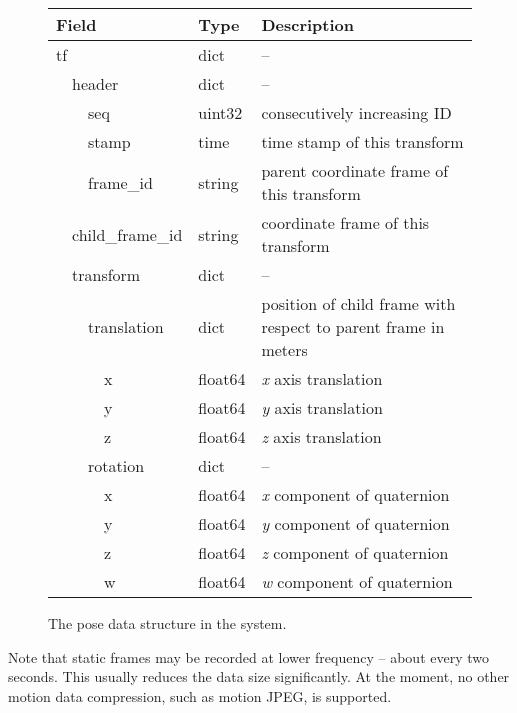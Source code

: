 \def\arraystretch{1.1}%
\begin{figure}[htb]
\begin{center}\begin{tabular}{ >{\ttfamily}p{3.5cm} >{\ttfamily}p{2cm} p{5cm} }
\toprule
\bf Field   & \bf Type & \bf Description \\ \midrule
tf			& dict	& -- \\
\ \ header		& dict		& -- \\
\ \ \ \ seq		& uint32	& consecutively increasing ID \\
\ \ \ \ stamp		& time		& time stamp of this transform \\
\ \ \ \ frame\_id	& string	& parent coordinate frame of this transform \\
\ \ child\_frame\_id	& string	& coordinate frame of this transform \\
\ \ transform		& dict		& -- \\
\ \ \ \ translation	& dict		& position of child frame with respect to parent frame in meters \\
\ \ \ \ \ \ x		& float64	& \emph{x} axis translation \\
\ \ \ \ \ \ y		& float64	& \emph{y} axis translation \\
\ \ \ \ \ \ z		& float64	& \emph{z} axis translation \\
\ \ \ \ rotation	& dict		& -- \\
\ \ \ \ \ \ x		& float64	& \emph{x} component of quaternion \\
\ \ \ \ \ \ y		& float64	& \emph{y} component of quaternion \\
\ \ \ \ \ \ z		& float64	& \emph{z} component of quaternion \\
\ \ \ \ \ \ w		& float64	& \emph{w} component of quaternion \\
\bottomrule
\end{tabular}\end{center}
\caption{The pose data structure in the \ease system.}
\label{fig:pose_data}
\end{figure}

Note that static frames may be recorded at lower frequency --
about every two seconds.
This usually reduces the data size significantly.
At the moment, no other motion data compression,
such as motion JPEG, is supported.


